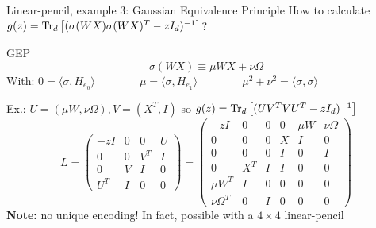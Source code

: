 \documentclass[10pt]{beamer}
\begin{document}
\begin{frame}{Linear-pencil, example 3: Gaussian Equivalence Principle}
  How to calculate $g(z) = \traceLim[d]{(\sigma(WX) \sigma(WX)^T - zI_d)^{-1}}$?
  \begin{block}{GEP \cite{pennington2017nonlinear}}
    \begin{equation}
      \sigma(WX) \equiv
      \mu W X + \nu \Omega
    \end{equation}
    With:
    $
      0 = \langle \sigma, H_{e_0} \rangle
      \qquad
      \qquad
      \mu = \langle \sigma, H_{e_1} \rangle
      \qquad
      \qquad
      \mu^2 + \nu^2 = \langle \sigma, \sigma \rangle
    $
  \end{block}
  Ex.: $U = (\mu W, \nu \Omega), V = (X^T, I)$ so $g(z) = \traceLim[d]{(U V^T V U^T - zI_d)^{-1}}$
  \begin{equation*}
    L = \begin{pmatrix}
      -z I & 0 & 0 & U\\
      0 & 0 & V^T & I\\
      0 & V & I & 0\\
      U^T & I & 0 & 0
    \end{pmatrix}
    = \begin{pmatrix}
      -z I & 0 & 0 & 0 & \mu W & \nu \Omega\\
      0  & 0 & 0 & X & I & 0\\
      0  & 0 & 0& I & 0 & I\\
      0 & X^T & I & I & 0 & 0\\
      \mu W^T  & I & 0 & 0 & 0 & 0\\
      \nu \Omega^T & 0 & I & 0 & 0 & 0
    \end{pmatrix}
  \end{equation*}
  \textbf{Note:} no unique encoding! In fact, possible with a $4\times 4$ linear-pencil
\end{frame}
\end{document}
